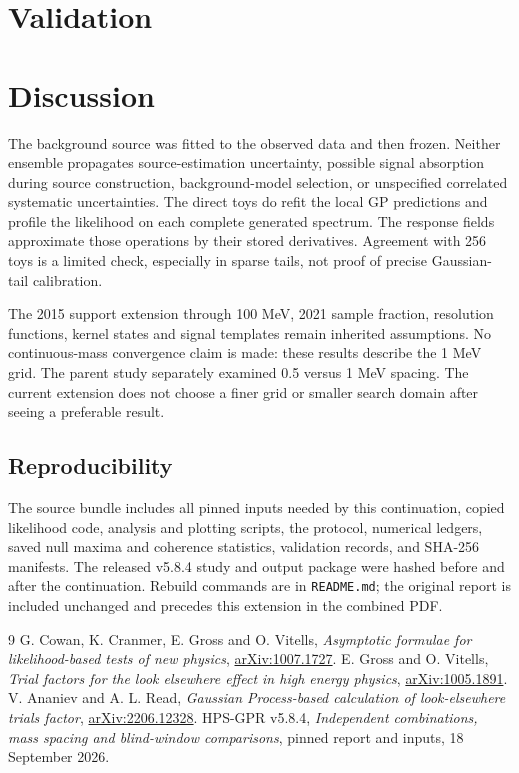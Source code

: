 \documentclass[11pt]{article}
\newcommand{\heading}[1]{\section{#1}}
\begin{document}
\heading{Validation}

\heading{Discussion}

The background source was fitted to the observed data and then frozen. Neither ensemble propagates source-estimation uncertainty, possible signal absorption during source construction, background-model selection, or unspecified correlated systematic uncertainties. The direct toys do refit the local GP predictions and profile the likelihood on each complete generated spectrum. The response fields approximate those operations by their stored derivatives. Agreement with 256 toys is a limited check, especially in sparse tails, not proof of precise Gaussian-tail calibration.

The 2015 support extension through 100 MeV, 2021 sample fraction, resolution functions, kernel states and signal templates remain inherited assumptions. No continuous-mass convergence claim is made: these results describe the 1 MeV grid. The parent study separately examined 0.5 versus 1 MeV spacing. The current extension does not choose a finer grid or smaller search domain after seeing a preferable result.


\subsection{Reproducibility}
The source bundle includes all pinned inputs needed by this continuation, copied likelihood code, analysis and plotting scripts, the protocol, numerical ledgers, saved null maxima and coherence statistics, validation records, and SHA-256 manifests. The released v5.8.4 study and output package were hashed before and after the continuation. Rebuild commands are in \texttt{README.md}; the original report is included unchanged and precedes this extension in the combined PDF.
\FloatBarrier
\begin{thebibliography}{9}
 G. Cowan, K. Cranmer, E. Gross and O. Vitells,
\textit{Asymptotic formulae for likelihood-based tests of new physics},
\href{https://arxiv.org/abs/1007.1727}{arXiv:1007.1727}.
 E. Gross and O. Vitells,
\textit{Trial factors for the look elsewhere effect in high energy physics},
\href{https://arxiv.org/abs/1005.1891}{arXiv:1005.1891}.
 V. Ananiev and A. L. Read,
\textit{Gaussian Process-based calculation of look-elsewhere trials factor},
\href{https://arxiv.org/abs/2206.12328}{arXiv:2206.12328}.
 HPS-GPR v5.8.4,
\textit{Independent combinations, mass spacing and blind-window comparisons},
pinned report and inputs, 18 September 2026.
\end{thebibliography}
\end{document}
